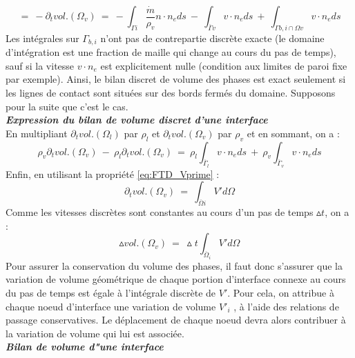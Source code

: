 \begin{equation}
=\:-\partial_{t}vol.(\Omega_{v})\:=\:-\int_{\Gamma i}\dfrac{\dot{m}}{\rho_{v}}n\cdot n_{e}ds\:-\:\int_{\overline{\Gamma}v}v \cdot n_{e} ds\:+\:\int_{\Gamma b,i \cap \Omega v} v \cdot n_{e} ds
\end{equation}
Les int\'egrales sur $\Gamma_{b,i}$ n'ont pas de contrepartie discrète exacte (le domaine d'int\'egration est une fraction de maille qui change au cours du pas de temps), sauf si la vitesse $v \cdot n_{e}$ est explicitement nulle (condition aux limites de paroi fixe par exemple). Ainsi, le bilan discret de volume des phases est exact seulement si les lignes de contact sont situ\'ees sur des bords ferm\'es du domaine. Supposons pour la suite que c'est le cas.\smallskip \\

\textit{\textbf{Expression du bilan de volume discret d'une interface}}\smallskip \\
En multipliant $\partial_{t}vol.(\Omega_{l})$ par $\rho_{l}$ et $\partial_{t}vol.(\Omega_{v})$ par $\rho_{v}$ et en sommant, on a :
\begin{equation}
\rho_{v}\partial_{t}vol.(\Omega_{v})\:-\:\rho_{l}\partial_{t}vol.(\Omega_{v})\:=\:\rho_{l}\int_{\overline{\Gamma}_{l}} v \cdot n_{e} ds\:+\:\rho_{v}\int_{\overline{\Gamma}_{v}} v \cdot n_{e} ds
\end{equation}
Enfin, en utilisant la propri\'et\'e \ref{eq:FTD_Vprime} :
\begin{equation}
\partial_{t}vol.(\Omega_{v})\:=\:\int_{\overline{\Omega} i} V' d\Omega
\end{equation}
Comme les vitesses discrètes sont constantes au cours d'un pas de temps $\vartriangle t$, on a :
\begin{equation}
\vartriangle vol.(\Omega_{v})\:=\:\vartriangle t \int_{\overline{\Omega}_{i}} V' d\Omega
\end{equation}
Pour assurer la conservation du volume des phases, il faut donc s'assurer que la variation de volume g\'eom\'etrique de chaque portion d'interface connexe au cours du pas de temps est \'egale \`a l'int\'egrale discr\`ete de $V'$.
Pour cela, on attribue \`a chaque noeud d'interface une variation de volume $V'_{i}$ , \`a l'aide des relations de passage conservatives. Le d\'eplacement de chaque noeud devra alors contribuer \`a la variation de volume qui lui est associ\'ee.\smallskip \\

\textit{\textbf{Bilan de volume d"une interface}}\smallskip \\

